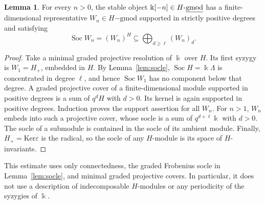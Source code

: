 \documentclass[11pt]{article}
\theoremstyle{definition}
\newtheorem{lem}[thm]{Lemma}
\numberwithin{equation}{section}
\def\udgmod{\mbox{-\underline{gmod}}}
\def\dgmod{\operatorname{-{gmod}}}
\newcommand{\kk}{\Bbbk}
\newcommand{\Soc}{\operatorname{Soc}}
\newcommand{\Ke}{\mathrm{Ker}}
\begin{document}
\begin{lem}\label{lem:syzygy-socle-window}
For every $n>0$, the stable object $\kk[-n]\in H\udgmod$ has a finite-dimensional
representative $W_n\in H\dgmod$ supported in strictly positive
degrees and satisfying
\begin{equation}\label{eq:syzygy-socle-window}
 \Soc W_n=(W_n)^H\subseteq\bigoplus_{d\ge\ell}(W_n)_d.
\end{equation}
\end{lem}
\begin{proof}
Take a minimal graded projective resolution of $\kk$ over $H$.  Its first
syzygy is $W_1=H_+$, embedded in $H$.  By Lemma~\ref{lem:socle},
$\Soc H=\kk\Lambda$ is concentrated in degree $\ell$, and hence
$\Soc W_1$ has no component below that degree.
A graded projective cover of a finite-dimensional module supported
in positive degrees is a sum of $q^dH$ with $d>0$.  Its kernel
is again supported in positive degrees.  Induction proves the
support assertion for all $W_n$.  For $n>1$, $W_n$ embeds into such
a projective cover, whose socle is a sum of $q^{d+\ell}\kk$ with
$d>0$.  The socle of a submodule is contained in the socle of its
ambient module.  Finally, $H_+=\Ke \varepsilon$ is the radical,
so the socle of any $H$-module is its space of $H$-invariants.
\end{proof}

This estimate uses only connectedness, the graded Frobenius socle in
Lemma~\ref{lem:socle}, and minimal graded projective covers.  In
particular, it does not use a description of indecomposable $H$-modules
or any periodicity of the syzygies of $\kk$.
\end{document}
